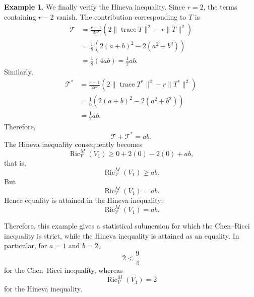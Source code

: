 \documentclass[10pt,a4paper]{article}
\theoremstyle{definition}
\newtheorem{example}[theorem]{Example}
\theoremstyle{remark}
\numberwithin{equation}{section}
\begin{document}
\begin{example}
We finally verify the Hineva inequality. Since $r=2$, the terms
containing $r-2$ vanish. The contribution corresponding to $T$ is
\[
\begin{aligned}
\mathcal{T}
&=
\frac{r-1}{2r^{2}}
\left(
2\|\operatorname{trace}T\|^{2}
-r\|T\|^{2}
\right)\\
&=
\frac18
\left(
2(a+b)^{2}
-
2(a^{2}+b^{2})
\right)\\
&=
\frac18(4ab)
=
\frac12ab.
\end{aligned}
\]
Similarly,
\[
\begin{aligned}
\mathcal{T}^{*}
&=
\frac{r-1}{2r^{2}}
\left(
2\|\operatorname{trace}T^{*}\|^{2}
-r\|T^{*}\|^{2}
\right)\\
&=
\frac18
\left(
2(a+b)^{2}
-
2(a^{2}+b^{2})
\right)\\
&=
\frac12ab.
\end{aligned}
\]
Therefore,
\[
\mathcal{T}+\mathcal{T}^{*}
=
ab.
\]
The Hineva inequality consequently becomes
\[
\operatorname{Ric}^{M}_{\mathcal V}(V_{1})
\geq
0+2(0)-2(0)+ab,
\]
that is,
\[
\operatorname{Ric}^{M}_{\mathcal V}(V_{1})
\geq ab.
\]
But
\[
\operatorname{Ric}^{M}_{\mathcal V}(V_{1})=ab.
\]
Hence equality is attained in the Hineva inequality:
\[
\boxed{
\operatorname{Ric}^{M}_{\mathcal V}(V_{1})=ab.
}
\]

Therefore, this example gives a statistical submersion for which the
Chen--Ricci inequality is strict, while the Hineva inequality is
attained as an equality. In particular, for $a=1$ and $b=2$,
\[
\boxed{
2<\frac94
}
\]
for the Chen--Ricci inequality, whereas
\[
\boxed{
\operatorname{Ric}^{M}_{\mathcal V}(V_{1})=2
}
\]
for the Hineva inequality.
\end{example}
\end{document}
